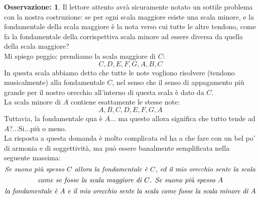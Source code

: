 \documentclass[12pt,a4paper]{report}
\theoremstyle{definition}
\theoremstyle{Theorem}
\theoremstyle{definition}
\theoremstyle{definition}
\theoremstyle{definition}
\newtheorem{Obs}[Def]{Osservazione:}
\begin{document}
	 		\begin{Obs}
	 			Il lettore attento avrà sicuramente notato un sottile problema con la nostra costruzione: se per ogni scala maggiore esiste una scala minore, e la fondamentale della scala maggiore è la nota verso cui tutte le altre tendono, come fa la fondamentale della corrispettiva scala minore ad essere diversa da quella della scala maggiore?\\
	 			Mi spiego peggio: prendiamo la scala maggiore di $C$:
	 			$$C,D,E,F,G,A,B,C$$
	 			In questa scala abbiamo detto che tutte le note vogliono risolvere (tendono musicalmente) alla fondamentale $C$, nel senso che il senso di appagamento più grande per il nostro orecchio all'interno di questa scala è dato da $C$.\\
	 			La scala minore di $A$ contiene esattamente le stesse note:
	 			$$A,B,C,D,E,F,G,A$$
	 			Tuttavia, la fondamentale qua è $A$... ma questo allora significa che tutto tende ad $A$?...Si...più o meno.\\
	 			La risposta a questa domanda è molto complicata ed ha a che fare con un bel po' di armonia e di soggettività, ma può essere banalmente semplificata nella seguente massima:
	 			$$\hbox{\textit{Se suono più spesso $C$ allora la fondamentale è $C$, ed il mio orecchio sente la scala}}$$ $$\hbox{\textit{come se fosse la scala maggiore di $C$. Se suono più spesso $A$}}$$
	 			$$\hbox{\textit{la fondamentale è $A$ e il mio orecchio sente la scala come fosse la scala minore di $A$}}$$
	 		\end{Obs}
\end{document}
